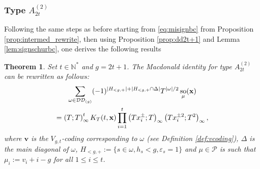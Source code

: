 \documentclass[11pt,letterpaper]{amsart}
\def\ccdd{\mathcal {DD}}
\def\ccp{\mathcal P}
\newtheorem{thm}[df]{Theorem}
\DeclareMathOperator{\oo}{so}
\numberwithin{equation}{section}
\numberwithin{df}{section}
\begin{document}
\subsubsection{Type $A^{(2)}_{2t}$}
Following the same steps as before starting from \eqref{eq:misignbc} from Proposition \ref{prop:intermed_rewrite}, then using Proposition \ref{prop:dd2t+1} and Lemma \ref{lem:signschurbc}, one derives the following results
\begin{thm}\label{prop:Macdotypebc}
Set $t\in\mathbb{N}^*$ and $g=2t+1$. The Macdonald identity for type $A^{(2)}_{2t}$ can be rewritten as follows:
\begin{multline}\label{eq:macdobc}
\sum_{\omega\in\ccdd_{(g)}} (-1)^{\lvert H_{<g,+}\rvert+\lvert H_{<g,+}\cap \Delta\rvert}T^{\lvert\omega\rvert/2}\oo_{\mu}({\bf x})\\=\left(T;T\right)_\infty^tK_T(t,{\bf x})
\prod_{i=1}^t \left(Tx_i^{\pm};T\right)_\infty \left(Tx_i^{\pm 2};T^2\right)_\infty,
\end{multline}
where $\mathbf{v}$ is the $V_{g,t}$-coding corresponding to $\omega$ (see Definition \ref{def:vcoding}), $\Delta$ is the main diagonal of $\omega$, $H_{<g,+}:=\lbrace s\in\omega, h_s<g, \varepsilon_s=1\rbrace$ and $\mu\in\ccp$ is such that
$\mu_i:=v_i+i-g$ for all $1\leq i \leq t$.
\end{thm}
\end{document}

